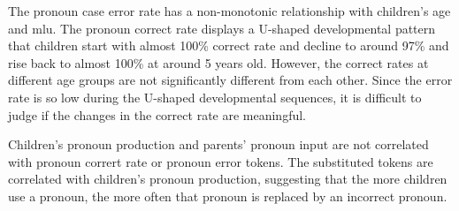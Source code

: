 The pronoun case error rate has a non-monotonic relationship with children's age and mlu. The pronoun correct rate displays a U-shaped developmental pattern that children start with almost 100\% correct rate and decline to around 97\% and rise back to almost 100\% at around 5 years old. However, the correct rates at different age groups are not significantly different from each other. Since the error rate is so low during the U-shaped developmental sequences, it is difficult to judge if the changes in the correct rate are meaningful. 

Children's pronoun production and parents' pronoun input are not correlated with pronoun corrert rate or pronoun error tokens. The substituted tokens are correlated with children's pronoun production, suggesting that the more children use a pronoun, the more often that pronoun is replaced by an incorrect pronoun. 

